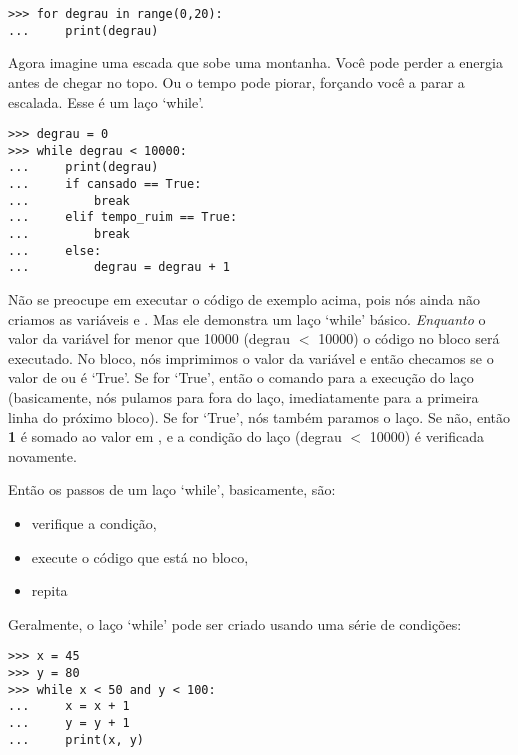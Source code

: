 \begin{listing}
\begin{verbatim}
>>> for degrau in range(0,20):
...     print(degrau)
\end{verbatim}
\end{listing}

Agora imagine uma escada que sobe uma montanha. Você pode perder a energia antes de chegar no topo. Ou o tempo pode piorar, forçando você a parar a escalada. Esse é um laço `while'.

\begin{listingignore}
\begin{verbatim}
>>> degrau = 0
>>> while degrau < 10000:
...     print(degrau)
...     if cansado == True:
...         break
...     elif tempo_ruim == True:
...         break
...     else:
...         degrau = degrau + 1
\end{verbatim}
\end{listingignore}

Não se preocupe em executar o código de exemplo acima, pois nós ainda não criamos as variáveis  e . Mas ele demonstra um laço `while' básico. \emph{Enquanto} o valor da variável  for menor que 10000 (degrau $<$ 10000) o código no bloco será executado. No bloco, nós imprimimos o valor da variável  e então checamos se o valor de  ou  é `True'. Se  for `True', então o comando  para a execução do laço (basicamente, nós pulamos para fora do laço, imediatamente para a primeira linha do próximo bloco). Se  for `True', nós também paramos o laço. Se não, então \textbf{1} é somado ao valor em , e a condição do laço (degrau $<$ 10000) é verificada novamente.
\par
\noindent
Então os passos de um laço `while', basicamente, são:

{\renewcommand{\labelitemi}{$\triangleright$}
\begin{itemize}
\item verifique a condição,
\item execute o código que está no bloco,
\item repita
\end{itemize}}

Geralmente, o laço `while' pode ser criado usando uma série de condições:

\begin{listing}
\begin{verbatim}
>>> x = 45
>>> y = 80
>>> while x < 50 and y < 100:
...     x = x + 1
...     y = y + 1
...     print(x, y)
\end{verbatim}
\end{listing}

